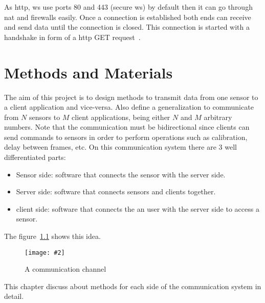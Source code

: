 \documentclass[hidelinks,11pt,a4paper,oneside,article]{memoir}
\newcommand{\putimage}[3][10] %
{
\begin{figure}[h]
	\centering
	\captionsetup{justification=centering}
	\texttt{[image: \#2]}
	\caption{#3}
	\label{fig:#2}
\end{figure}
}
\begin{document}
As \gls{http}, \gls{ws} use ports 80 and 443 (secure \gls{ws}) by default then it can go through \gls{nat} and firewalls easily. Once a connection is established both ends can receive and send data until the connection is closed. This connection is started with a handshake in form of a \gls{http} GET request~\cite[6]{rfc6455}. 



\clearpage\chapter{Methods and Materials}\label{sec:methods-and-materials}

The aim of this project is to design methods to transmit data from one sensor to a client application and vice-versa. Also define a generalization to communicate from $N$ sensors to $M$ client applications, being either $N$ and $M$ arbitrary numbers. Note that the communication must be bidirectional since clients can send commands to sensors in order to perform operations such as calibration, delay between frames, etc. On this communication system there are 3 well differentiated parts:
\begin{itemize}
    \item Sensor side: software that connects the sensor with the server side.
    \item Server side: software that connects sensors and clients together.
    \item client side: software that connects the an user with the server side to access a sensor.
\end{itemize}

The figure~\ref{fig:communication-channel} shows this idea.

\putimage{communication-channel}{A communication channel}

This chapter discuss about methods for each side of the communication system in detail.
\end{document}
